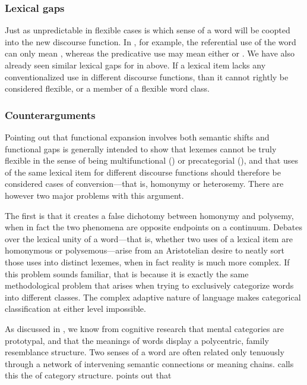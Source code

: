 \subsubsection{Lexical gaps}
\label{sec:2.3.3.3}

Just as unpredictable in flexible cases is which sense of a word will be coopted into the new discourse function. In , for example, the referential use of the word  can only mean , whereas the predicative use may mean either  or  \parencite[91]{Kihm2017}. We have also already seen similar lexical gaps for  in  above. If a lexical item lacks any conventionalized use in different discourse functions, than it cannot rightly be considered flexible, or a member of a flexible word class.

\subsubsection{Counterarguments}
\label{sec:2.3.3.4}

Pointing out that functional expansion involves both semantic shifts and functional gaps is generally intended to show that lexemes cannot be truly flexible in the sense of being multifunctional () or precategorial (), and that uses of the same lexical item for different discourse functions should therefore be considered cases of conversion—that is, homonymy or heterosemy. There are however two major problems with this argument.

The first is that it creates a false dichotomy between homonymy and polysemy, when in fact the two phenomena are opposite endpoints on a continuum. Debates over the lexical unity of a word—that is, whether two uses of a lexical item are homonymous or polysemous—arise from an Aristotelian desire to neatly sort those uses into distinct lexemes, when in fact reality is much more complex. If this problem sounds familiar, that is because it is exactly the same methodological problem that arises when trying to exclusively categorize words into different classes. The complex adaptive nature of language makes categorical classification at either level impossible.

As discussed in , we know from cognitive research that mental categories are prototypal, and that the meanings of words display a polycentric, family resemblance structure. Two senses of a word are often related only tenuously through a network of intervening semantic connections or meaning chains. \textcite{Langacker1988} calls this the  of category structure. \citeauthor{Taylor2003} points out that 

